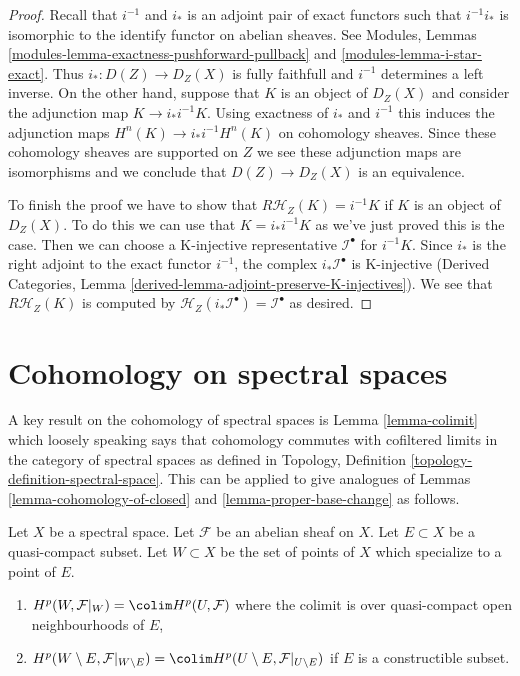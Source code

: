 \begin{proof}
Recall that $i^{-1}$ and $i_*$ is an adjoint pair of exact functors such
that $i^{-1}i_*$ is isomorphic to the identify functor on abelian sheaves. See
Modules, Lemmas \ref{modules-lemma-exactness-pushforward-pullback} and
\ref{modules-lemma-i-star-exact}. Thus
$i_* : D(Z) \to D_Z(X)$ is fully faithfull and $i^{-1}$ determines
a left inverse. On the other hand, suppose that $K$ is an object of
$D_Z(X)$ and consider the adjunction map $K \to i_*i^{-1}K$.
Using exactness of $i_*$ and $i^{-1}$ this induces the adjunction maps
$H^n(K) \to i_*i^{-1}H^n(K)$ on cohomology sheaves. Since these cohomology
sheaves are supported on $Z$ we see these adjunction maps are isomorphisms
and we conclude that $D(Z) \to D_Z(X)$ is an equivalence.

\medskip\noindent
To finish the proof we have to show that $R\mathcal{H}_Z(K) = i^{-1}K$ if
$K$ is an object of $D_Z(X)$. To do this we can use that $K = i_*i^{-1}K$
as we've just proved this is the case. Then we
can choose a K-injective representative $\mathcal{I}^\bullet$ for $i^{-1}K$.
Since $i_*$ is the right adjoint to the exact functor $i^{-1}$, the
complex $i_*\mathcal{I}^\bullet$ is K-injective
(Derived Categories, Lemma \ref{derived-lemma-adjoint-preserve-K-injectives}).
We see that $R\mathcal{H}_Z(K)$ is computed by
$\mathcal{H}_Z(i_*\mathcal{I}^\bullet) = \mathcal{I}^\bullet$ as desired.
\end{proof}




\section{Cohomology on spectral spaces}
\label{section-spectral}

\noindent
A key result on the cohomology of spectral spaces is Lemma \ref{lemma-colimit}
which loosely speaking says that cohomology commutes with cofiltered limits
in the category of spectral spaces as defined in
Topology, Definition \ref{topology-definition-spectral-space}.
This can be applied to give analogues of
Lemmas \ref{lemma-cohomology-of-closed} and \ref{lemma-proper-base-change}
as follows.

\begin{lemma}
\label{lemma-cohomology-of-neighbourhoods-of-closed}
Let $X$ be a spectral space. Let $\mathcal{F}$ be an abelian sheaf on $X$.
Let $E \subset X$ be a quasi-compact subset. Let $W \subset X$ be the set of
points of $X$ which specialize to a point of $E$.
\begin{enumerate}
\item $H^p(W, \mathcal{F}|_W) = \colim H^p(U, \mathcal{F})$
where the colimit is over quasi-compact open neighbourhoods of $E$,
\item $H^p(W \setminus E, \mathcal{F}|_{W \setminus E}) =
\colim H^p(U \setminus E, \mathcal{F}|_{U \setminus E})$
if $E$ is a constructible subset.
\end{enumerate}
\end{lemma}

